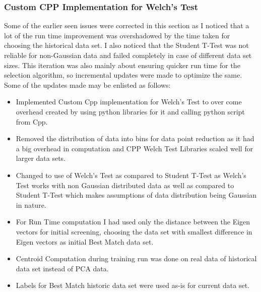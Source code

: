 \documentclass{vldb}
\begin{document}
\subsubsection{Custom CPP Implementation for Welch’s Test}
Some of the earlier seen issues were corrected in this section as I noticed that a lot of the run time improvement was overshadowed by the time taken for choosing the historical data set. I also noticed that the Student T-Test was not reliable for non-Gaussian data and failed completely in case of different data set sizes.
This iteration was also mainly about ensuring quicker run time for the selection algorithm, so incremental updates were made to optimize the same. Some of the updates made may be enlisted as follows:
\begin{itemize}
    \item Implemented Custom Cpp implementation for Welch’s Test to over come overhead created by using python libraries for it and calling python script from Cpp.
    \item Removed the distribution of data into bins for data point reduction as it had a big overhead in computation and CPP Welch Test Libraries scaled well for larger data sets.
    \item Changed to use of Welch’s Test as compared to Student T-Test as Welch’s Test works with non Gaussian distributed data as well as compared to Student T-Test which makes assumptions of data distribution being Gaussian in nature.
    \item For Run Time computation I had used only the distance between the Eigen vectors for initial screening, choosing the data set with smallest difference in Eigen vectors as initial Best Match data set.
    \item Centroid Computation during training run was done on real data of historical data set instead of PCA data.
    \item Labels for Best Match historic data set were used as-is for current data set.
\end{itemize}
\end{document}
